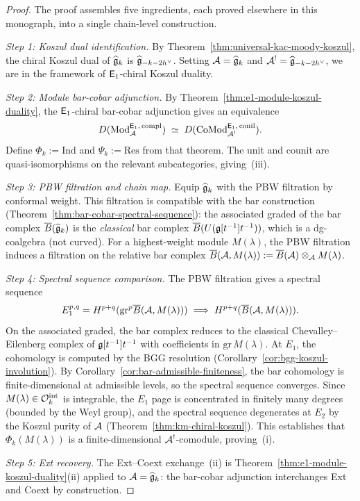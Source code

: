 \begin{proof}
The proof assembles five ingredients, each proved elsewhere in this
monograph, into a single chain-level construction.

\emph{Step 1: Koszul dual identification.}
By Theorem~\ref{thm:universal-kac-moody-koszul}, the chiral Koszul
dual of $\widehat{\mathfrak{g}}_k$ is $\widehat{\mathfrak{g}}_{-k-2h^\vee}$.
Setting $\mathcal{A} = \widehat{\mathfrak{g}}_k$ and
$\mathcal{A}^! = \widehat{\mathfrak{g}}_{-k-2h^\vee}$, we are in the framework of
$\mathsf{E}_1$-chiral Koszul duality.

\emph{Step 2: Module bar-cobar adjunction.}
By Theorem~\ref{thm:e1-module-koszul-duality}, the $\mathsf{E}_1$-chiral
bar-cobar adjunction gives an equivalence
\[
D(\mathrm{Mod}^{\mathsf{E}_1,\,\mathrm{compl}}_{\mathcal{A}})
\;\simeq\;
D(\mathrm{CoMod}^{\mathsf{E}_1,\,\mathrm{conil}}_{\mathcal{A}^!}).
\]
Define $\Phi_k := \mathrm{Ind}$ and $\Psi_k := \mathrm{Res}$ from
that theorem.  The unit and counit are quasi-isomorphisms on the
relevant subcategories, giving~(iii).

\emph{Step 3: PBW filtration and chain map.}
Equip $\widehat{\mathfrak{g}}_k$ with the PBW filtration by conformal weight.
This filtration is compatible with the bar construction
(Theorem~\ref{thm:bar-cobar-spectral-sequence}): the associated
graded of the bar complex $\overline{B}(\widehat{\mathfrak{g}}_k)$ is the
\emph{classical} bar complex $\overline{B}(U(\mathfrak{g}[t^{-1}]t^{-1}))$, which
is a dg-coalgebra (not curved).  For a highest-weight module
$M(\lambda)$, the PBW filtration induces a filtration on the
relative bar complex
$\overline{B}(\mathcal{A}, M(\lambda)) := \overline{B}(\mathcal{A}) \otimes_{\mathcal{A}} M(\lambda)$.

\emph{Step 4: Spectral sequence comparison.}
The PBW filtration gives a spectral sequence
\[
E_1^{p,q} = H^{p+q}(\mathrm{gr}^p \overline{B}(\mathcal{A}, M(\lambda)))
\;\Longrightarrow\;
H^{p+q}(\overline{B}(\mathcal{A}, M(\lambda))).
\]
On the associated graded, the bar complex reduces to the classical
Chevalley--Eilenberg complex of $\mathfrak{g}[t^{-1}]t^{-1}$ with
coefficients in $\mathrm{gr}\, M(\lambda)$.  At $E_1$, the
cohomology is computed by the BGG resolution
(Corollary~\ref{cor:bgg-koszul-involution}).
By Corollary~\ref{cor:bar-admissible-finiteness}, the bar cohomology
is finite-dimensional at admissible levels, so the spectral sequence
converges.  Since $M(\lambda) \in \mathcal{O}_k^{\mathrm{int}}$ is
integrable, the $E_1$ page is concentrated in finitely many degrees
(bounded by the Weyl group), and the spectral sequence degenerates at
$E_2$ by the Koszul purity of $\mathcal{A}$
(Theorem~\ref{thm:km-chiral-koszul}).  This establishes that
$\Phi_k(M(\lambda))$ is a finite-dimensional $\mathcal{A}^!$-comodule,
proving~(i).

\emph{Step 5: Ext recovery.}
The Ext--Coext exchange~(ii) is
Theorem~\ref{thm:e1-module-koszul-duality}(ii) applied to
$\mathcal{A} = \widehat{\mathfrak{g}}_k$: the bar-cobar adjunction interchanges
Ext and Coext by construction.
\end{proof}

